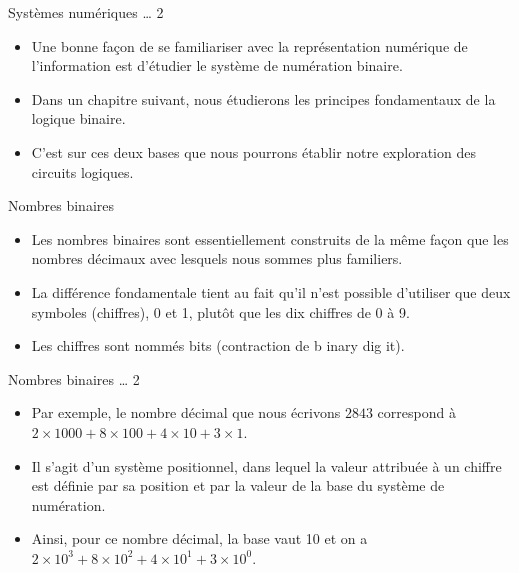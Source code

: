 \documentclass[presentation]{beamer}
\begin{document}
\begin{frame}[label={sec:orgf58a2b9}]{Systèmes numériques \ldots{} 2}
\begin{itemize}
\item Une bonne façon de se familiariser avec la représentation numérique de l'information est d'étudier le système de numération binaire.

\item Dans un chapitre suivant, nous étudierons les principes fondamentaux de la logique binaire.

\item C'est sur ces deux bases que nous pourrons établir notre exploration des circuits logiques.
\end{itemize}
\end{frame}

\begin{frame}[label={sec:org9c73ec7}]{Nombres binaires}
\begin{itemize}
\item Les nombres binaires sont essentiellement construits de la même façon que les nombres décimaux avec lesquels nous sommes plus familiers.

\item La différence fondamentale tient au fait qu'il n'est possible d'utiliser que deux symboles (chiffres), 0 et 1, plutôt que les dix chiffres de 0 à 9.

\item Les chiffres sont nommés bits (contraction de \alert{b} inary dig \alert{it}).
\end{itemize}
\end{frame}

\begin{frame}[label={sec:org341a92e}]{Nombres binaires \ldots{} 2}
\begin{itemize}
\item Par exemple, le nombre décimal que nous écrivons \(2843\) correspond à \(2 \times 1000 + 8 \times 100 + 4 \times 10 + 3 \times 1\).

\item Il s'agit d'un système positionnel, dans lequel la valeur attribuée à un chiffre est définie par sa position et par la valeur de la \alert{base} du système de numération.

\item Ainsi, pour ce nombre décimal, la base vaut 10 et on a \(2 \times 10^3 + 8 \times 10^2 + 4 \times 10^1 + 3 \times 10^0\).
\end{itemize}
\end{frame}
\end{document}
